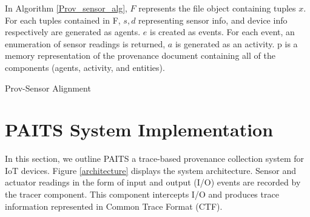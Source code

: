 \documentclass[conference]{IEEEtran}
\begin{document}
In Algorithm \ref{Prov_sensor_alg}, $F$  represents the  file object containing tuples $x$. For each tuples contained in F, $s, d$ representing sensor info, and device info respectively are generated as agents. $e$ is created as events. For each event, an enumeration of sensor readings is returned, $a$ is generated as an activity. p is a memory representation of the provenance document containing all of the components (agents, activity, and entities).

\begin{algorithm}[h!]
\caption{Prov-Sensor Alignment}
\label{Prov_sensor_alg}

\end{algorithm}




\section{PAITS System Implementation}
In this section, we outline  PAITS a trace-based provenance collection system for IoT devices. Figure \ref{architecture} displays the system architecture. Sensor and actuator readings in the form of input and output (I/O) events are recorded by the tracer component. This component intercepts I/O and produces trace information represented in Common Trace Format (CTF). 
\end{document}
